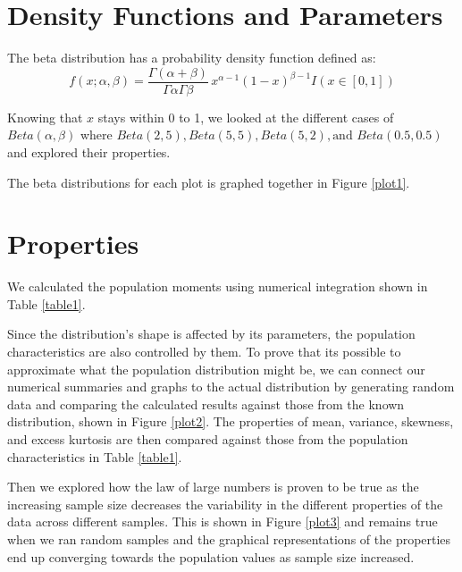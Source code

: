 \documentclass{article}\usepackage[]{graphicx}\usepackage[]{xcolor}
\begin{document}
\begin{multicols}{2}
\section{Density Functions and Parameters}
The beta distribution has a probability density function defined as: 
\[
f(x; \alpha, \beta) = \frac{\Gamma(\alpha + \beta)}{\Gamma\alpha\Gamma\beta} \, x^{\alpha - 1} (1 - x)^{\beta - 1}I(x \in [0,1])
\] 

Knowing that $x$ stays within 0 to 1, we looked at the different cases of \(Beta(\alpha, \beta)\) where \(Beta(2, 5), Beta(5,5), Beta(5, 2), \text{and }Beta(0.5, 0.5)\) and explored their properties. 

The beta distributions for each plot is graphed together in Figure \ref{plot1}.

\section{Properties}
We calculated the population moments using numerical integration shown in Table \ref{table1}.

Since the distribution's shape is affected by its parameters, the population characteristics are also controlled by them. To prove that its possible to approximate what the population distribution might be, we can connect our numerical summaries and graphs to the actual distribution by generating random data and comparing the calculated results against those from the known distribution, shown in Figure \ref{plot2}. The properties of mean, variance, skewness, and excess kurtosis are then compared against those from the population characteristics in Table \ref{table1}.

Then we explored how the law of large numbers is proven to be true as the increasing sample size decreases the variability in the different properties of the data across different samples. This is shown in Figure \ref{plot3} and remains true when we ran random samples and the graphical representations of the properties end up converging towards the population values as sample size increased. 




\end{multicols}
\end{document}
